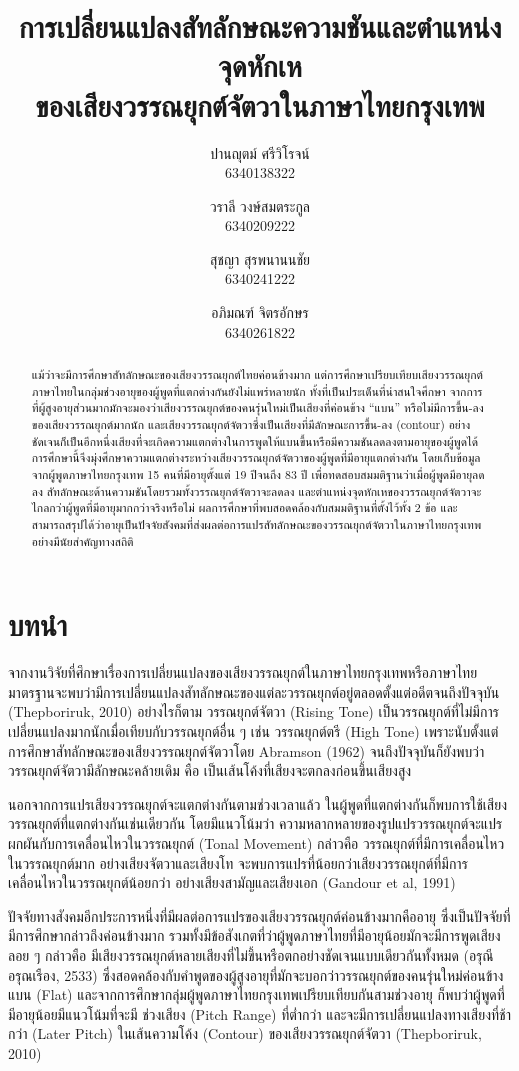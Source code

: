 \documentclass[a4paper]{article}
\title{การเปลี่ยนแปลงสัทลักษณะความชันและตำแหน่งจุดหักเห\\ของเสียงวรรณยุกต์จัตวาในภาษาไทยกรุงเทพ}
\author{
    ปานญุตม์ ศรีวิโรจน์\\6340138322
    \and
    วราลี วงษ์สมตระกูล\\6340209222
    \and
    สุชญา สุรพนานนชัย\\6340241222
    \and
    อภิมณฑ์ จิตรอักษร\\6340261822
}
\date{}
\begin{document}
\maketitle
\begin{abstract}
    แม้ว่าจะมีการศึกษาสัทลักษณะของเสียงวรรณยุกต์ไทยค่อนข้างมาก แต่การศึกษาเปรียบเทียบเสียงวรรณยุกต์ภาษาไทยในกลุ่มช่วงอายุของผู้พูดที่แตกต่างกันยังไม่แพร่หลายนัก ทั้งที่เป็นประเด็นที่น่าสนใจศึกษา จากการที่ผู้สูงอายุส่วนมากมักจะมองว่าเสียงวรรณยุกต์ของคนรุ่นใหม่เป็นเสียงที่ค่อนข้าง “แบน” หรือไม่มีการขึ้น-ลงของเสียงวรรณยุกต์มากนัก  และเสียงวรรณยุกต์จัตวาซึ่งเป็นเสียงที่มีลักษณะการขึ้น-ลง (contour) อย่างชัดเจนก็เป็นอีกหนึ่งเสียงที่จะเกิดความแตกต่างในการพูดให้แบนขึ้นหรือมีความชันลดลงตามอายุของผู้พูดได้ การศึกษานี้จึงมุ่งศึกษาความแตกต่างระหว่างเสียงวรรณยุกต์จัตวาของผู้พูดที่มีอายุแตกต่างกัน โดยเก็บข้อมูลจากผู้พูดภาษาไทยกรุงเทพ 15 คนที่มีอายุตั้งแต่ 19 ปีจนถึง 83 ปี เพื่อทดสอบสมมติฐานว่าเมื่อผู้พูดมีอายุลดลง สัทลักษณะด้านความชันโดยรวมทั้งวรรณยุกต์จัตวาจะลดลง และตำแหน่งจุดหักเหของวรรณยุกต์จัตวาจะไกลกว่าผู้พูดที่มีอายุมากกว่าจริงหรือไม่ ผลการศึกษาที่พบสอดคล้องกับสมมติฐานที่ตั้งไว้ทั้ง 2 ข้อ และสามารถสรุปได้ว่าอายุเป็นปัจจัยสังคมที่ส่งผลต่อการแปรสัทลักษณะของวรรณยุกต์จัตวาในภาษาไทยกรุงเทพอย่างมีนัยสำคัญทางสถิติ
\end{abstract}
\section{บทนำ}
    จากงานวิจัยที่ศึกษาเรื่องการเปลี่ยนแปลงของเสียงวรรณยุกต์ในภาษาไทยกรุงเทพหรือภาษาไทยมาตรฐานจะพบว่ามีการเปลี่ยนแปลงสัทลักษณะของแต่ละวรรณยุกต์อยู่ตลอดตั้งแต่อดีตจนถึงปัจจุบัน (Thepboriruk, 2010) อย่างไรก็ตาม วรรณยุกต์จัตวา (Rising Tone) เป็นวรรณยุกต์ที่ไม่มีการเปลี่ยนแปลงมากนักเมื่อเทียบกับวรรณยุกต์อื่น ๆ เช่น วรรณยุกต์ตรี (High Tone) เพราะนับตั้งแต่การศึกษาสัทลักษณะของเสียงวรรณยุกต์จัตวาโดย Abramson (1962) จนถึงปัจจุบันก็ยังพบว่าวรรณยุกต์จัตวามีลักษณะคล้ายเดิม คือ เป็นเส้นโค้งที่เสียงจะตกลงก่อนขึ้นเสียงสูง

    นอกจากการแปรเสียงวรรณยุกต์จะแตกต่างกันตามช่วงเวลาแล้ว ในผู้พูดที่แตกต่างกันก็พบการใช้เสียงวรรณยุกต์ที่แตกต่างกันเช่นเดียวกัน โดยมีแนวโน้มว่า ความหลากหลายของรูปแปรวรรณยุกต์จะแปรผกผันกับการเคลื่อนไหวในวรรณยุกต์ (Tonal Movement) กล่าวคือ วรรณยุกต์ที่มีการเคลื่อนไหวในวรรณยุกต์มาก อย่างเสียงจัตวาและเสียงโท จะพบการแปรที่น้อยกว่าเสียงวรรณยุกต์ที่มีการเคลื่อนไหวในวรรณยุกต์น้อยกว่า อย่างเสียงสามัญและเสียงเอก (Gandour et al, 1991)

    ปัจจัยทางสังคมอีกประการหนึ่งที่มีผลต่อการแปรของเสียงวรรณยุกต์ค่อนข้างมากคืออายุ ซึ่งเป็นปัจจัยที่มีการศึกษากล่าวถึงค่อนข้างมาก รวมทั้งมีข้อสังเกตที่ว่าผู้พูดภาษาไทยที่มีอายุน้อยมักจะมีการพูดเสียงลอย ๆ กล่าวคือ มีเสียงวรรณยุกต์หลายเสียงที่ไม่ขึ้นหรือตกอย่างชัดเจนแบบเดียวกันทั้งหมด (อรุณี อรุณเรือง, 2533) ซึ่งสอดคล้องกับคำพูดของผู้สูงอายุที่มักจะบอกว่าวรรณยุกต์ของคนรุ่นใหม่ค่อนข้างแบน (Flat) และจากการศึกษากลุ่มผู้พูดภาษาไทยกรุงเทพเปรียบเทียบกันสามช่วงอายุ ก็พบว่าผู้พูดที่มีอายุน้อยมีแนวโน้มที่จะมี ช่วงเสียง (Pitch Range) ที่ต่ำกว่า และจะมีการเปลี่ยนแปลงทางเสียงที่ช้ากว่า (Later Pitch) ในเส้นความโค้ง (Contour) ของเสียงวรรณยุกต์จัตวา (Thepboriruk, 2010)
\end{document}
